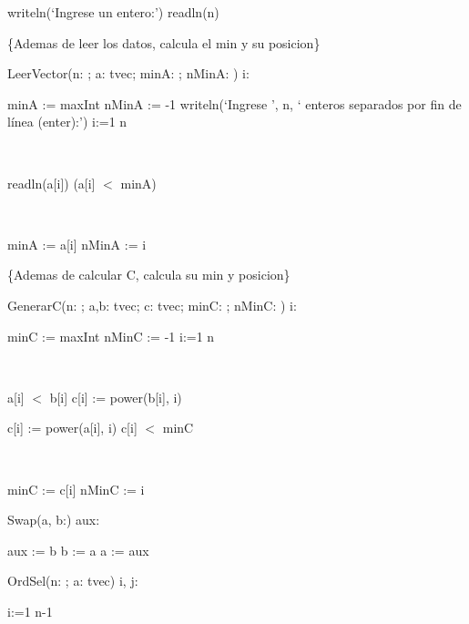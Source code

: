 \documentclass[answers]{exam}
\begin{document}
\begin{questions}
\begin{solution}
\begin{algorithm}[H]
\qquad	writeln(`Ingrese un entero:')\;
\qquad	readln(n)\;
\End\;

\BlankLine

\{Ademas de leer los datos, calcula el min y su posicion\}\

\Procedure LeerVector(n: \Integer; \Var a: tvec; \Var minA: \Real; \Var nMinA: \Integer)\;
\Var i: \Integer\;
\Begin\

\qquad	minA := maxInt\;
\qquad	nMinA := -1\;
\qquad	writeln(`Ingrese ', n, ` enteros separados por fin de línea (enter):')\;
\qquad	\For i:=1 \To n \Do\

\qquad	\Begin\

\qquad	\qquad	readln(a[i])\;
\qquad	\qquad	\If (a[i] $<$ minA) \Then\

\qquad	\qquad	\Begin\

\qquad	\qquad	\qquad	minA := a[i]\;
\qquad	\qquad	\qquad	nMinA := i\;
\qquad	\qquad 	\End\;
\qquad	\End\;
\End\;

\BlankLine

\end{algorithm}

\begin{algorithm}[H]
\setcounter{AlgoLine}{27}
\{Ademas de calcular C, calcula su min y posicion\}\

\Procedure GenerarC(n: \Integer; a,b: tvec; \Var c: tvec; \Var minC: \Real; \Var nMinC: \Integer)\;
\Var i: \Integer\;
\Begin\

\qquad	minC := maxInt\;
\qquad	nMinC := -1\;
\qquad	\For i:=1 \To n \Do\

\qquad	\Begin\

\qquad	\qquad	\If a[i] $<$ b[i] \Then c[i] := power(b[i], i) \

\qquad	\qquad	\Else c[i] := power(a[i], i)\;
\qquad	\qquad	\If c[i] $<$ minC \Then\

\qquad	\qquad	\Begin\

\qquad	\qquad	\qquad	minC := c[i]\;
\qquad	\qquad	\qquad	nMinC := i\;
\qquad	\qquad	\End\;
\qquad	\End\;
\End\;

\BlankLine

\Procedure Swap(\Var a, b:\Real)\;
\Var aux: \Real\;
\Begin\

\qquad	aux := b\;
\qquad	b := a\;
\qquad	a := aux\;
\End\;

\BlankLine

\Procedure OrdSel(n: \Integer; \Var a: tvec)\;
\Var i, j: \Integer\;
\Begin\

\qquad	\For 	i:=1 \To n-1 \Do\


\end{algorithm}
\end{solution}
\end{questions}
\end{document}
